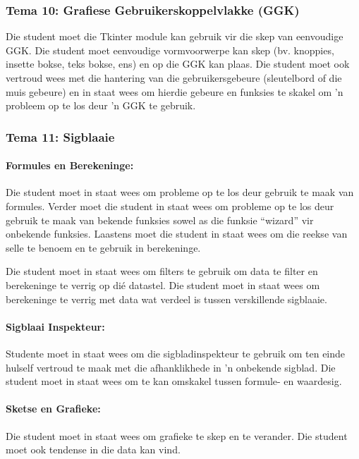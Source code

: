 	\subsubsection {Tema 10: Grafiese Gebruikerskoppelvlakke (GGK)} 
             Die student moet die Tkinter module kan gebruik vir die skep van 
             eenvoudige GGK. Die student moet eenvoudige 
             vormvoorwerpe kan skep (bv. knoppies, insette bokse, teks bokse, ens) en 
             op die GGK kan plaas. Die student moet ook
             vertroud wees met die hantering van die gebruikersgebeure (sleutelbord of die muis gebeure) 
             en in staat wees om hierdie gebeure en funksies te skakel om 
             'n probleem op te los deur 'n GGK te gebruik.
   

        \subsubsection{Tema 11: Sigblaaie}
            \paragraph{Formules en Berekeninge:}
                Die student moet in staat wees om probleme op te los deur gebruik 
                te maak van formules. Verder moet die student in staat wees om probleme
                op te los deur gebruik te maak van bekende funksies sowel as die
                funksie ``wizard'' vir onbekende funksies.  Laastens moet die student in staat
                wees om die reekse van selle te benoem en te gebruik in berekeninge.
                
		Die student moet in staat wees om filters te gebruik om data te filter
		en berekeninge te verrig op di\'{e} datastel.  Die student
		moet in staat wees om berekeninge te verrig met data wat verdeel is
		tussen verskillende sigblaaie.
		
            \paragraph{Sigblaai Inspekteur:}
		Studente moet in staat wees om die sigbladinspekteur te gebruik
		om ten einde hulself vertroud te maak met die afhanklikhede in 'n 
		onbekende sigblad.  Die student moet in staat wees om te kan omskakel 
		tussen formule- en waardesig.
  
            \paragraph{Sketse en Grafieke:}
                Die student moet in staat wees om grafieke te skep en te verander.
                Die student moet ook tendense in die data kan vind.          

